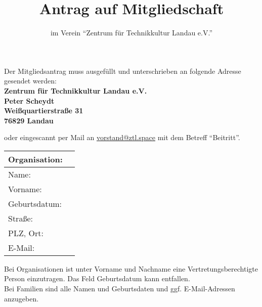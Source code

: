 \documentclass[a4paper, 11pt]{scrartcl}
\begin{document}
\vspace{-6cm}
\title{\vspace{-2.0cm}Antrag auf Mitgliedschaft}
\subtitle{im Verein "`Zentrum für Technikkultur Landau e.V."'}
\author{}
\date{}

\maketitle
\thispagestyle{empty}
\vspace{-2cm}

Der Mitgliedsantrag muss ausgefüllt und unterschrieben an folgende Adresse gesendet werden:\\

\textbf{Zentrum für Technikkultur Landau e.V.\\
Peter Scheydt\\
Weißquartierstraße 31\\
76829 Landau\\
}

oder eingescannt per Mail an \href{mailto:vorstand@ztl.space}{vorstand@ztl.space} mit dem Betreff "`Beitritt"'.\\

\renewcommand{\arraystretch}{1.8}
\begin{tabularx}{\linewidth}{lX}\toprule
	Organisation:						& \\ \midrule
	Name: 								& \\ \midrule
	Vorname: 							& \\ \midrule
	Geburtsdatum: 						& \\ \midrule
	Straße: 							& \\ \midrule
	PLZ, Ort: 							& \\ \midrule
	E-Mail:								& \\ 
	\bottomrule
\end{tabularx}

\vspace{0.5cm}

{\tiny Bei Organisationen ist unter Vorname und Nachname eine Vertretungsberechtigte Person einzutragen. Das Feld Geburtsdatum kann entfallen. \\
Bei Familien sind alle Namen und Geburtsdaten und ggf. E-Mail-Adressen anzugeben.}

\vspace{0.5cm}
\end{document}

